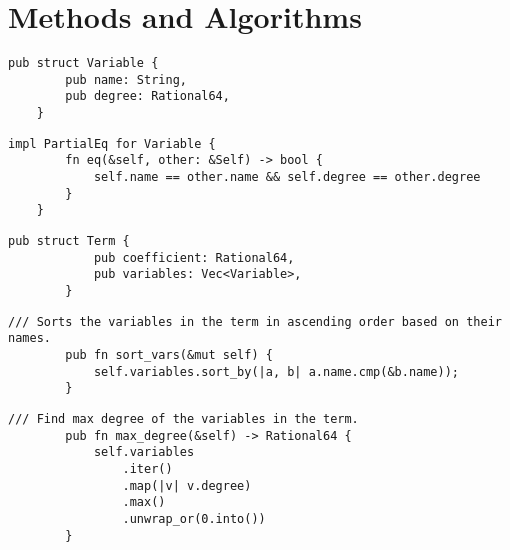 \appendix
\chapter{Methods and Algorithms}\label{chap:appendix-a}

\lstset{style=colouredRust,numbers=none,language=Rust}

\begin{lstlisting}[caption={The \texttt{Variable} struct}, label={lst:variable}]
    pub struct Variable {
        pub name: String,
        pub degree: Rational64,
    }
\end{lstlisting}

\begin{lstlisting}[caption={The implementation of \texttt{PartialEq} for the \texttt{Variable} struct}, label={lst:variable-eq}]
    impl PartialEq for Variable {
        fn eq(&self, other: &Self) -> bool {
            self.name == other.name && self.degree == other.degree
        }
    }
\end{lstlisting}

\begin{minipage}{\linewidth}
    \begin{lstlisting}[caption={The \texttt{Term} struct}, label={lst:term}]
        pub struct Term {
            pub coefficient: Rational64,
            pub variables: Vec<Variable>,
        }    
    \end{lstlisting}
\end{minipage}

\begin{minipage}{\linewidth}
    \begin{lstlisting}[caption={The implementation of the \texttt{sort\_vars()} method for the \texttt{Term} struct}, label={lst:term-sort-vars}]
        /// Sorts the variables in the term in ascending order based on their names.
        pub fn sort_vars(&mut self) {
            self.variables.sort_by(|a, b| a.name.cmp(&b.name));
        }
    \end{lstlisting}
\end{minipage}

\begin{minipage}{\linewidth}
    \begin{lstlisting}[caption={The implementation of the \texttt{max\_degree()} method for the \texttt{Term} struct}, label={lst:term-max-degree}]
        /// Find max degree of the variables in the term.
        pub fn max_degree(&self) -> Rational64 {
            self.variables
                .iter()
                .map(|v| v.degree)
                .max()
                .unwrap_or(0.into())
        }
    \end{lstlisting}
\end{minipage}

